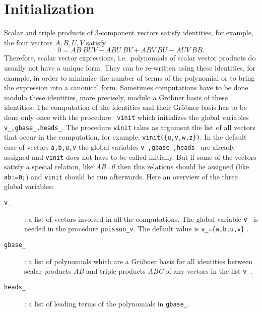\documentclass[12pt]{article}
\begin{document}
\section{Initialization}
Scalar and triple products of 3-component vectors satisfy 
identities, for example, the four vectors $A,B,U,V$ satisfy
\[ 0 = AB\ BUV - ABU\ BV + ABV\ BU - AUV\ BB. \]
Therefore, scalar vector expressions, i.e.\ polynomials of scalar
vector products do usually not have a unique form. They can be
re-written using these identities, for example, in order to minimize
the number of terms of the polynomial or to bring the expression into
a canonical form. Sometimes computations have to
be done modulo these identities, more precisely, modulo a Gr\"{o}bner
basis of these identities. The computation of the identities and their
Gr\"{o}bner basis has to be done only once with the procedure {\tt
vinit} which initializes the global variables {\tt v\_,gbase\_,heads\_}. 
The procedure {\tt vinit} takes as argument the list of
all vectors that occur in the computation, for example, 
{\tt vinit(\{u,v,w,z\})}. In the default case of
vectors {\tt a,b,u,v} the global variables {\tt v\_,gbase\_,heads\_}
are already assigned and {\tt vinit} does not have to be called
initially. But if some of the vectors satisfy a special relation, like
{\it AB=0} then this relations should be assigned (like {\tt ab:=0;})
and {\tt vinit} should be run afterwards. Here an overview of the three global
variables:
\begin{description}
\item[{\tt v\_}] : a list of vectors involved in all the computations. 
      The global variable {\tt v\_} is needed in the procedure 
      {\tt poisson\_v}. The default value is {\tt v\_=\{a,b,u,v\}} .
\item[{\tt gbase\_}] : a list of polynomials which are a Gr\"{o}bner 
      basis for all identities between scalar products %
      {\it AB} and triple products {\it ABC} %
      of any vectors in the list {\tt v\_}.
\item[{\tt heads\_}] : a list of leading terms of the polynomials in 
      {\tt gbase\_}.
\end{description}
\end{document}
